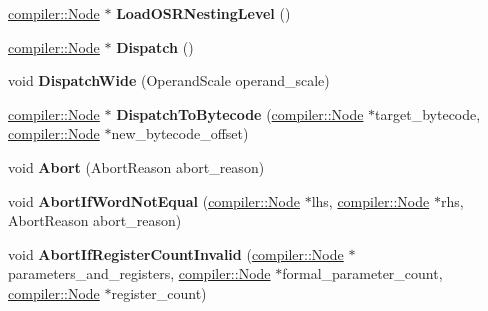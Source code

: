 \begin{DoxyCompactItemize}
\mbox{\hyperlink{classv8_1_1internal_1_1compiler_1_1Node}{compiler\+::\+Node}} $\ast$ {\bfseries Load\+O\+S\+R\+Nesting\+Level} ()
\item 
\mbox{\label{classv8_1_1internal_1_1interpreter_1_1InterpreterAssembler_a0cefb945d4bf73fd69a3a6f1fcf48d87}} 
\mbox{\hyperlink{classv8_1_1internal_1_1compiler_1_1Node}{compiler\+::\+Node}} $\ast$ {\bfseries Dispatch} ()
\item 
\mbox{\label{classv8_1_1internal_1_1interpreter_1_1InterpreterAssembler_a95727da6307472c66e173f78f6c8e646}} 
void {\bfseries Dispatch\+Wide} (Operand\+Scale operand\+\_\+scale)
\item 
\mbox{\label{classv8_1_1internal_1_1interpreter_1_1InterpreterAssembler_a21652cb0d97937cb496f03c0b4216144}} 
\mbox{\hyperlink{classv8_1_1internal_1_1compiler_1_1Node}{compiler\+::\+Node}} $\ast$ {\bfseries Dispatch\+To\+Bytecode} (\mbox{\hyperlink{classv8_1_1internal_1_1compiler_1_1Node}{compiler\+::\+Node}} $\ast$target\+\_\+bytecode, \mbox{\hyperlink{classv8_1_1internal_1_1compiler_1_1Node}{compiler\+::\+Node}} $\ast$new\+\_\+bytecode\+\_\+offset)
\item 
\mbox{\label{classv8_1_1internal_1_1interpreter_1_1InterpreterAssembler_a6d257a1b229464fb8f4fe048db0a78b3}} 
void {\bfseries Abort} (Abort\+Reason abort\+\_\+reason)
\item 
\mbox{\label{classv8_1_1internal_1_1interpreter_1_1InterpreterAssembler_a01e990cfe7fa7c023e47f940f87f6887}} 
void {\bfseries Abort\+If\+Word\+Not\+Equal} (\mbox{\hyperlink{classv8_1_1internal_1_1compiler_1_1Node}{compiler\+::\+Node}} $\ast$lhs, \mbox{\hyperlink{classv8_1_1internal_1_1compiler_1_1Node}{compiler\+::\+Node}} $\ast$rhs, Abort\+Reason abort\+\_\+reason)
\item 
\mbox{\label{classv8_1_1internal_1_1interpreter_1_1InterpreterAssembler_a9bf614e8cb3a668a0330391710ccd31e}} 
void {\bfseries Abort\+If\+Register\+Count\+Invalid} (\mbox{\hyperlink{classv8_1_1internal_1_1compiler_1_1Node}{compiler\+::\+Node}} $\ast$parameters\+\_\+and\+\_\+registers, \mbox{\hyperlink{classv8_1_1internal_1_1compiler_1_1Node}{compiler\+::\+Node}} $\ast$formal\+\_\+parameter\+\_\+count, \mbox{\hyperlink{classv8_1_1internal_1_1compiler_1_1Node}{compiler\+::\+Node}} $\ast$register\+\_\+count)

\end{DoxyCompactItemize}
